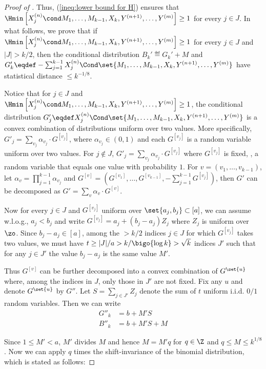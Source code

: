 \begin{proof}[Proof of ]
		Thus, (\ref{ineq:lower bound for H}) ensures that $\Hmin\left[X^{(n)}_{j} \cond M_1,\ldots, M_{k-1}, X_k, Y^{(n+1)},\ldots, Y^{(m)} \right]\ge 1$ for every $j\in J$.
%
		In what follows, we prove that if $\Hmin\left[X^{(n)}_{j} \cond M_1,\ldots, M_{k-1}, X_k, Y^{(n+1)},\ldots, Y^{(m)} \right]\ge 1$ for every $j\in J$ and $|J|>k/2$, 
		then the conditional distribution
		$B_k'\eqdef G_k'+M$  and
		$G_k'\eqdef -\sum_{j=1}^{k-1}X^{(n)}_{j} \Cond \set{M_1,\ldots, M_{k-1}, X_k, Y^{(n+1)},\ldots, Y^{(m)}}$ have statistical distance $\le k^{-1/8}$.

		Notice that for $j\in J$ and $\Hmin\left[X^{(n)}_{j} \cond M_1,\ldots, M_{k-1}, X_k, Y^{(n+1)},\ldots, Y^{(m)} \right]\ge 1$,
		the conditional distribution 
		$G'_j\eqdef X^{(n)}_{j} \Cond \set{M_1,\ldots, M_{k-1}, X_k, Y^{(n+1)},\ldots, Y^{(m)}}$ is a convex combination of distributions uniform over two values.
		More specifically, $G'_j=\sum_{v_j} \alpha_{v_j}\cdot G^{[v_j]}$, where $\alpha_{v_j}\in (0,1)$  and each $G^{[v_j]}$ is a random variable uniform over two values. %
		For $j\notin J$, $G'_j=\sum_{v_j} \alpha_{v_j} \cdot G^{[v_j]} $ where $G^{[v_j]}$ is fixed, \ie, a random variable that equals one value with probability $1$.
		For $v=(v_1,\dots,v_{k-1})$, let $\alpha_v=\prod_{j=1}^{k-1}\alpha_{v_j}$ and $G^{[v]}=\left(G^{[v_1]},\ldots,G^{[v_{k-1}]}, -\sum_{j=1}^{k-1} G^{[v_j]}\right)$,
		then $G'$ can be decomposed as
		$G'=\sum_{v} \alpha_v\cdot G^{[v]}$. 


		Now for every $j\in J$ and $G^{[v_j]}$ uniform over $\set{a_j,b_j}\subset [a]$,
		we can assume w.l.o.g., $a_j<b_j$ and write $G^{[v_j]}=a_j + (b_j-a_j) Z_j$ where $Z_j$ is uniform over $\zo$.
		Since $b_j-a_j\in [a]$, among the $>k/2$ indices $j\in J$ for which $G^{[v_j]}$ takes two values, 
		we must have $t\ge |J|/a>k/\bigo{\log k}>\sqrt{k}$ indices $J'$ such that for any $j\in J'$ the value $b_j-a_j$ is the same value $M'$.

		Thus $G^{[v]}$ can be further decomposed into a convex combination of $G^\set{u}$ where, among the indices in $J$, only those in $J'$ are not fixed.
		Fix any $u$ and denote $G^\set{u}$ by $G''$.
		Let $S=\sum_{j\in J'} Z_j$ denote the sum of $t$ uniform i.i.d. $0/1$ random variables.
		Then we can write
		\begin{align*}
			G''_k &= b + M' S\\
			B''_k &= b + M' S + M
		\end{align*}

		Since $1\le M'<a$, $M'$ divides $M$ and hence $M=M'q$ for $q\in \Z$ and $q\le M\le k^{1/8}$.
%
		Now we can apply $q$ times the shift-invariance of the binomial distribution, which is stated as follows:


\end{proof}

